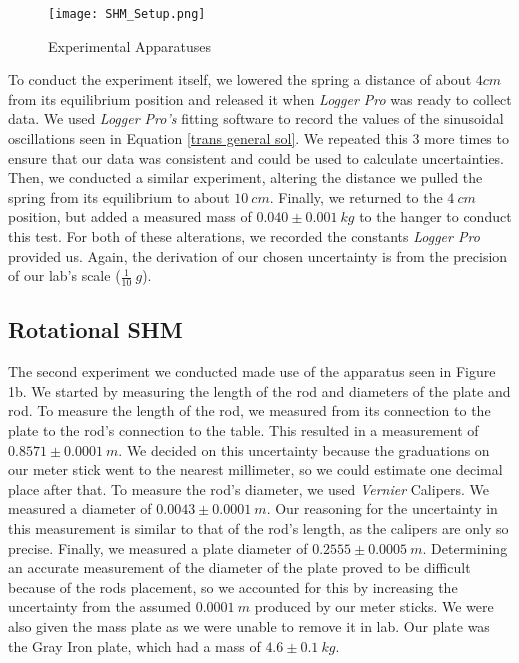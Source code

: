 \documentclass[12pt]{article}
\begin{document}
\begin{wrapfigure}{R}{0.5\textwidth}
  \begin{center}
    \texttt{[image: SHM\_Setup.png]}
  \end{center}
  \caption{Experimental Apparatuses}
  \label{apparatus}
\end{wrapfigure}

To conduct the experiment itself, we lowered the spring a distance of about $4cm$ from its equilibrium position and released it when \textit{Logger Pro} was ready to collect data. We used \textit{Logger Pro's} fitting software to record the values of the sinusoidal oscillations seen in Equation \ref{trans general sol}. We repeated this 3 more times to ensure that our data was consistent and could be used to calculate uncertainties. Then, we conducted a similar experiment, altering the distance we pulled the spring from its equilibrium to about $10\ cm$. Finally, we returned to the $4\ cm$ position, but added a measured mass of $0.040\pm 0.001\ kg$ to the hanger to conduct this test. For both of these alterations, we recorded the constants \textit{Logger Pro} provided us. Again, the derivation of our chosen uncertainty is from the precision of our lab's scale ($\frac{1}{10}\ g$). \par

\subsection{Rotational SHM}
The second experiment we conducted made use of the apparatus seen in Figure 1b. We started by measuring the length of the rod and diameters of the plate and rod. To measure the length of the rod, we measured from its connection to the plate to the rod's connection to the table. This resulted in a measurement of $0.8571\pm0.0001\ m$. We decided on this uncertainty because the graduations on our meter stick went to the nearest millimeter, so we could estimate one decimal place after that. To measure the rod's diameter, we used \textit{Vernier} Calipers. We measured a diameter of $0.0043\pm0.0001\ m$. Our reasoning for the uncertainty in this measurement is similar to that of the rod's length, as the calipers are only so precise. Finally, we measured a plate diameter of $0.2555\pm 0.0005\ m$. Determining an accurate measurement of the diameter of the plate proved to be difficult because of the rods placement, so we accounted for this by increasing the uncertainty from the assumed $0.0001\ m$ produced by our meter sticks. We were also given the mass plate as we were unable to remove it in lab. Our plate was the Gray Iron plate, which had a mass of $4.6\pm0.1\ kg$. \par
\end{document}
